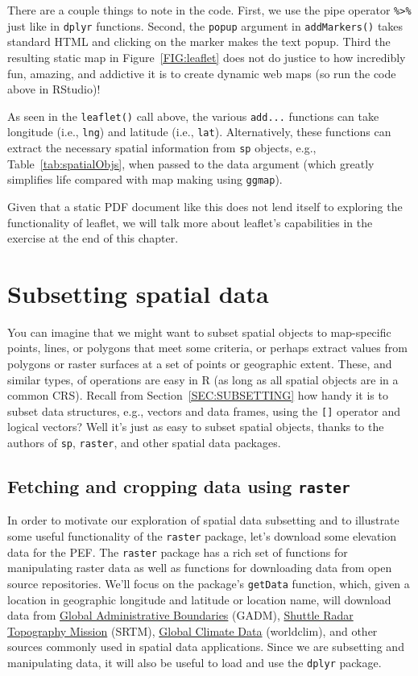 \documentclass[12pt,oneside]{book}\usepackage[]{graphicx}\usepackage[]{color}
\begin{document}
There are a couple things to note in the code. First, we use the pipe operator \verb+%>%+ just like in \verb+dplyr+ functions. Second, the \verb+popup+ argument in \verb+addMarkers()+ takes standard HTML and clicking on the marker makes the text popup. Third the resulting static map in Figure~\ref{FIG:leaflet} does not do justice to how incredibly fun, amazing, and addictive it is to create dynamic web maps (so run the code above in RStudio)!

As seen in the \verb+leaflet()+ call above, the various \verb+add...+ functions can take longitude (i.e., \verb+lng+) and latitude (i.e., \verb+lat+). Alternatively, these functions can extract the necessary spatial information from \verb+sp+ objects, e.g., Table~\ref{tab:spatialObjs}, when passed to the data argument (which greatly simplifies life compared with map making using \verb+ggmap+).

Given that a static PDF document like this does not lend itself to exploring the functionality of leaflet, we will talk more about leaflet's capabilities in the exercise at the end of this chapter.

\section{Subsetting spatial data}

You can imagine that we might want to subset spatial objects to map-specific points, lines, or polygons that meet some criteria, or perhaps extract values from polygons or raster surfaces at a set of points or geographic extent. These, and similar types, of operations are easy in R (as long as all spatial objects are in a common CRS). Recall from Section~\ref{SEC:SUBSETTING} how handy it is to subset data structures, e.g., vectors and data frames, using the \verb+[]+ operator and logical vectors? Well it's just as easy to subset spatial objects, thanks to the authors of \verb+sp+, \verb+raster+, and other spatial data packages.

\subsection{Fetching and cropping data using \texttt{raster}}

In order to motivate our exploration of spatial data subsetting and to illustrate some useful functionality of the \verb+raster+ package, let's download some elevation data for the PEF. The \verb+raster+ package has a rich set of functions for manipulating raster data as well as functions for downloading data from open source repositories. We'll focus on the package's \verb+getData+ function, which, given a location in geographic longitude and latitude or location name, will download data from \href{http://www.gadm.org/}{Global Administrative Boundaries} (GADM), \href{https://www2.jpl.nasa.gov/srtm/}{Shuttle Radar Topography Mission} (SRTM), \href{http://www.worldclim.org/}{Global Climate Data} (worldclim), and other sources commonly used in spatial data applications. Since we are subsetting and manipulating data, it will also be useful to load and use the \verb+dplyr+ package.
\end{document}
